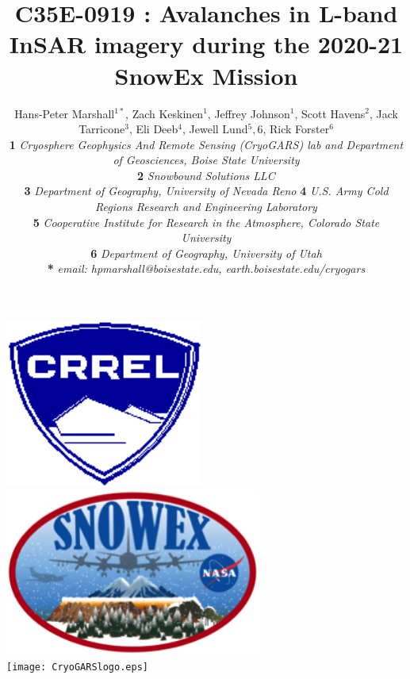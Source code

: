 \documentclass[landscape,a0b,final]{a0poster}
\title{C35E-0919 : Avalanches in L-band InSAR imagery during the 2020-21 SnowEx Mission}
\author{ \LARGE{Hans-Peter Marshall$^{1*}$, Zach Keskinen$^{1}$, Jeffrey Johnson$^{1}$, Scott Havens$^{2}$, Jack Tarricone$^3$, Eli Deeb$^4$, Jewell Lund$^5,6$, Rick Forster$^6$}\\ %
\textbf{1} \textit{Cryosphere Geophysics And Remote Sensing (CryoGARS) lab and Department of Geosciences, Boise State University} \\
\textbf{2} \textit{Snowbound Solutions LLC} \\
\textbf{3} \textit{Department of Geography, University of Nevada Reno}
\textbf{4} \textit{U.S. Army Cold Regions Research and Engineering Laboratory} \\
\textbf{5} \textit{Cooperative Institute for Research in the Atmosphere, Colorado State University} \\
\textbf{6} \textit{Department of Geography, University of Utah} \\
\textbf{*} \textit{email: hpmarshall@boisestate.edu, earth.boisestate.edu/cryogars}}
\begin{document}

\colorbox{boxcol}{		%
\begin{minipage}[c]{0.8525\textwidth}	%
\maketitle
\end{minipage}

\begin{minipage}[c]{0.15\textwidth}
\begin{flushright}
\includegraphics[height=5.5cm]{CRRELlogo.png} \hspace{0.2cm} %
\includegraphics[height=5.5cm]{SnowExLogo.png} \vspace{0.2cm} \\
\texttt{[image: CryoGARSlogo.eps]} \\

\end{flushright}
\end{minipage}

}
\vspace{1cm}
\end{document}
